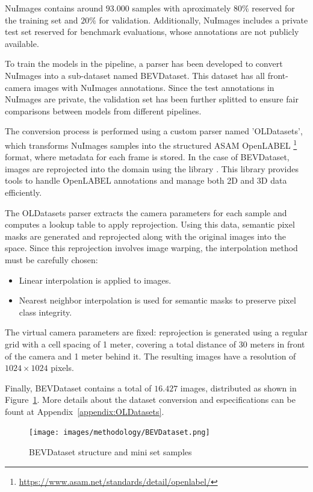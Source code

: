 NuImages contains around $93.000$ samples with aproximately $80\%$ reserved for the training set and $20\%$ for validation. Additionally, NuImages includes a private test set reserved for benchmark evaluations, whose annotations are not publicly available.

To train the models in the pipeline, a parser has been developed to convert NuImages into a sub-dataset named BEVDataset. This dataset has all front-camera images with NuImages annotations. Since the test annotations in NuImages are private, the validation set has been further splitted to ensure fair comparisons between models from different pipelines.

The conversion process is performed using a custom parser named 'OLDatasets', which transforms NuImages samples into the structured ASAM OpenLABEL \footnote{\url{https://www.asam.net/standards/detail/openlabel/}} format, where metadata for each frame is stored. In the case of BEVDataset, images are reprojected into the  domain using the  library \cite{VCD}. This library provides tools to handle OpenLABEL annotations and manage both 2D and 3D data efficiently.

The OLDatasets parser extracts the camera parameters for each sample and computes a lookup table to apply  reprojection. Using this data, semantic pixel masks are generated and reprojected along with the original images into the  space. Since this reprojection involves image warping, the interpolation method must be carefully chosen:
\begin{itemize}
    \item Linear interpolation is applied to images.
    \item Nearest neighbor interpolation is used for semantic masks to preserve pixel class integrity. 
\end{itemize}

The virtual  camera parameters are fixed:  reprojection is generated using a regular grid with a cell spacing of 1 meter, covering a total distance of 30 meters in front of the camera and 1 meter behind it. The resulting images have a resolution of $1024 \times 1024$ pixels.

Finally, BEVDataset contains a total of $16.427$ images, distributed as shown in Figure~\ref{fig:bev_dataset}. More details about the dataset conversion and especifications can be fount at Appendix~\ref{appendix:OLDatasets}.

\begin{figure}[h!]
    \centering
    \texttt{[image: images/methodology/BEVDataset.png]}
    \caption{BEVDataset structure and mini set samples}
    \label{fig:bev_dataset}
\end{figure}

